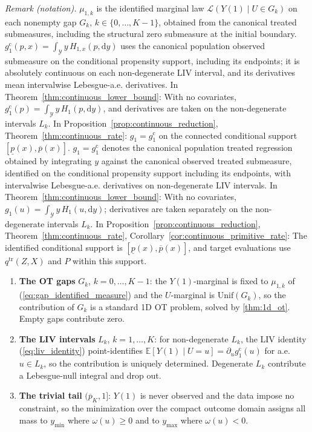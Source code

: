 \noindent\textit{Remark (notation).} $\mu_{1,k}$ is the identified marginal law $\mathcal L(Y(1)\mid U\in G_k)$ on each nonempty gap $G_k$, $k\in\{0,\ldots,K-1\}$, obtained from the canonical treated submeasures, including the structural zero submeasure at the initial boundary. $g_1^{\mathrm c}(p,x)=\int_{\mathcal Y}y\,H_{1,x}(p,\mathrm dy)$ uses the canonical population observed submeasure on the conditional propensity support, including its endpoints; it is absolutely continuous on each non-degenerate LIV interval, and its derivatives mean intervalwise Lebesgue-a.e. derivatives. In Theorem~\ref{thm:continuous_lower_bound}: With no covariates, $g_1^{\mathrm c}(p)=\int_{\mathcal Y}y\,H_1(p,\mathrm dy)$, and derivatives are taken on the non-degenerate intervals $L_k$. In Proposition~\ref{prop:continuous_reduction}, Theorem~\ref{thm:continuous_rate}: $g_1=g_1^{\mathrm c}$ on the connected conditional support $[\underline p(x),\overline p(x)]$. $g_1=g_1^{\mathrm c}$ denotes the canonical population treated regression obtained by integrating $y$ against the canonical observed treated submeasure, identified on the conditional propensity support including its endpoints, with intervalwise Lebesgue-a.e. derivatives on non-degenerate LIV intervals. In Theorem~\ref{thm:continuous_lower_bound}: With no covariates, $g_1(u)=\int_{\mathcal Y}y\,H_1(u,\mathrm dy)$; derivatives are taken separately on the non-degenerate intervals $L_k$. In Proposition~\ref{prop:continuous_reduction}, Theorem~\ref{thm:continuous_rate}, Corollary~\ref{cor:continuous_primitive_rate}: The identified conditional support is $[\underline p(x),\overline p(x)]$, and target evaluations use $q^{\mathrm{tr}}(Z,X)$ and $P$ within this support.


\begin{enumerate}
    \item \textbf{The OT gaps} $G_k$, $k=0,\dots,K-1$: the $Y(1)$-marginal is fixed to $\mu_{1,k}$ of (\ref{eq:gap_identified_measure}) and the $U$-marginal is $\text{Unif}(G_k)$, so the contribution of $G_k$ is a standard 1D OT problem, solved by \cref{thm:1d_ot}. Empty gaps contribute zero.
    \item \textbf{The LIV intervals} $L_k$, $k=1,\dots,K$: for non-degenerate $L_k$, the LIV identity (\ref{eq:liv_identity}) point-identifies $\mathbb{E}[Y(1)\mid U=u]=\partial_u g_1^{\mathrm c}(u)$ for a.e.\ $u \in L_k$, so the contribution is uniquely determined. Degenerate $L_k$ contribute a Lebesgue-null integral and drop out.
    \item \textbf{The trivial tail} $(\overline{p}_K, 1]$: $Y(1)$ is never observed and the data impose no constraint, so the minimization over the compact outcome domain assigns all mass to $y_{\min}$ where $\omega(u) \geqslant 0$ and to $y_{\max}$ where $\omega(u) < 0$.
\end{enumerate}


